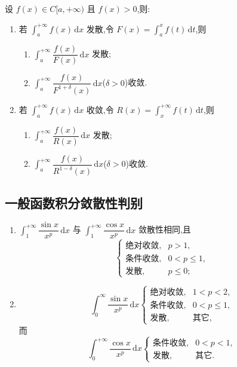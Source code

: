 \documentclass[../数学分析培优讲义.tex]{subfiles}
\begin{document}
\begin{proposition}[\markstar]
设 $f(x)\in C\lbrack a,+\infty)$ 且 $f(x)>0$,则:
\begin{enumerate}[label=(\arabic*)]
    \item 若 $\displaystyle\int_a^{+\infty}f(x)\,\mathrm{d}x$ 发散,令 $\displaystyle F(x)=\int_a^xf(t)\,\mathrm{d}t$,则
    \begin{enumerate}[label=\textcircled{\arabic*}]
        \item $\displaystyle\int_a^{+\infty}\dfrac{f(x)}{F(x)}\,\mathrm{d}x$ 发散;
        \item $\displaystyle\int_a^{+\infty}\dfrac{f(x)}{F^{1+\delta}(x)}\,\mathrm{d}x$($\delta>0$)收敛.
    \end{enumerate}
    \item 若 $\displaystyle\int_a^{+\infty}f(x)\,\mathrm{d}x$ 收敛,令 $\displaystyle R(x)=\int_x^{+\infty}f(t)\,\mathrm{d}t$,则
    \begin{enumerate}[label=\textcircled{\arabic*}]
        \item $\displaystyle\int_a^{+\infty}\dfrac{f(x)}{R(x)}\,\mathrm{d}x$ 发散;
        \item $\displaystyle\int_a^{+\infty}\dfrac{f(x)}{R^{1-\delta}(x)}\,\mathrm{d}x$($\delta>0$)收敛.
    \end{enumerate}
\end{enumerate}
\end{proposition}


\newpage

\subsection{一般函数积分敛散性判别}

\begin{proposition}[\markstar]
\begin{enumerate}[label=(\arabic*)]
    \item $\displaystyle\int_1^{+\infty}\dfrac{\sin x}{x^p}\,\mathrm{d}x$ 与 $\displaystyle\int_1^{+\infty}\dfrac{\cos x}{x^p}\,\mathrm{d}x$ 敛散性相同,且
    \[
        \begin{cases}
            \text{绝对收敛},&p>1,\\
            \text{条件收敛},&0<p\leq1,\\
            \text{发散},&p\leq0;
        \end{cases}
    \]
    \item
    \[
        \int_0^\infty\dfrac{\sin x}{x^p}\,\mathrm{d}x
        \begin{cases}
            \text{绝对收敛},&1<p<2,\\
            \text{条件收敛},&0<p\leq1,\\
            \text{发散},&\text{其它},
        \end{cases}
    \]
    而
    \[
        \int_0^{+\infty}\dfrac{\cos x}{x^p}\,\mathrm{d}x
        \begin{cases}
            \text{条件收敛},&0<p<1,\\
            \text{发散},&\text{其它}.
        \end{cases}
    \]
\end{enumerate}
\end{proposition}
\end{document}
